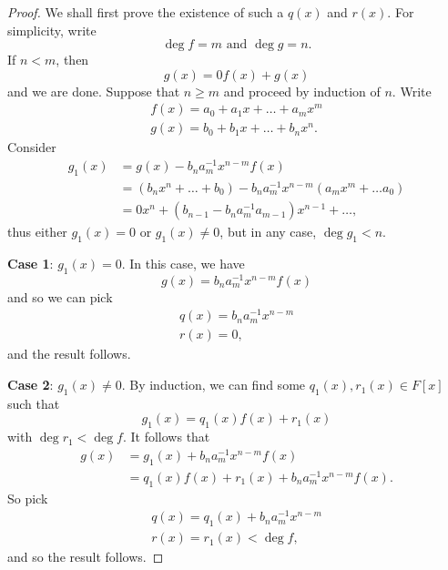 \begin{proof}
  We shall first prove the existence of such a $q(x)$ and $r(x)$. For simplicity, write
  \begin{equation*}
    \deg f = m \text{ and } \deg g = n.
  \end{equation*}
  If $n < m$, then
  \begin{equation*}
    g(x) = 0 f(x) + g(x)
  \end{equation*}
  and we are done. Suppose that $n \geq m$ and proceed by induction of $n$. Write
  \begin{gather*}
    f(x) = a_0 + a_1 x + \hdots + a_m x^m \\
    g(x) = b_0 + b_1 x + \hdots + b_n x^n.
  \end{gather*}
  Consider
  \begin{align*}
    g_1 (x) &= g(x) - b_n a_m^{-1} x^{n - m} f(x) \\
            &= (b_n x^n + \hdots + b_0) - b_n a_m^{-1} x^{n - m} ( a_m x^m + \hdots a_0 ) \\
            &= 0 x^n + (b_{n - 1} - b_n a_m^{-1} a_{m - 1}) x^{n - 1} + \hdots,
  \end{align*}
  thus either $g_1 (x) = 0$ or $g_1(x) \neq 0$, but in any case, $\deg g_1 < n$.

  \noindent \textbf{Case 1}: $g_1(x) = 0$. In this case, we have
  \begin{equation*}
    g(x) = b_n a_m^{-1} x^{n - m} f(x)
  \end{equation*}
  and so we can pick
  \begin{gather*}
    q(x) = b_n a_m^{-1} x^{n - m} \\
    r(x) = 0,
  \end{gather*}
  and the result follows.

  \noindent \textbf{Case 2}: $g_1(x) \neq 0$. By induction, we can find some $q_1 (x), r_1(x) \in F[x]$ such that
  \begin{equation*}
    g_1(x) = q_1(x) f(x) + r_1(x)
  \end{equation*}
  with $\deg r_1 < \deg f$. It follows that
  \begin{align*}
    g(x) &= g_1(x) + b_n a_m^{-1} x^{n - m} f(x) \\
         &= q_1(x) f(x) + r_1(x) + b_n a_m^{-1} x^{n - m} f(x).
  \end{align*}
  So pick
  \begin{gather*}
    q(x) = q_1 (x) + b_n a_m^{-1} x^{n - m} \\
    r(x) = r_1 (x) < \deg f,
  \end{gather*}
  and so the result follows.


\end{proof}
